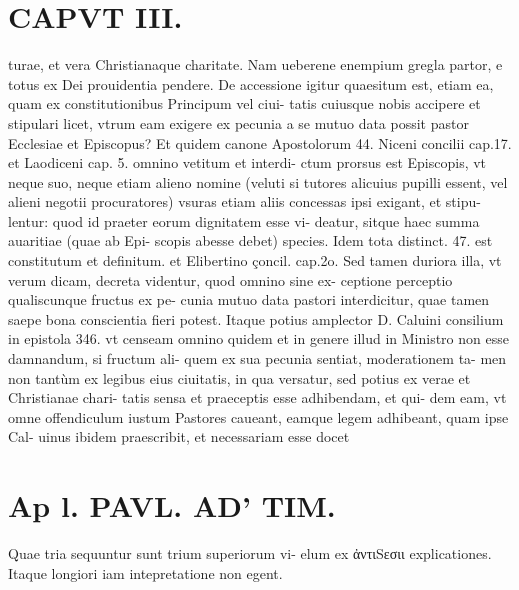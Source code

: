 \documentclass{article}
\begin{document}
\begin{pages}
\section*{CAPVT  III. }
\marginpar{[ p.139 ]}\pstart turae, et vera Christianaque charitate. Nam ueberene enempium gregla partor, e totus ex Dei prouidentia pendere.  \pend\pstart De accessione igitur quaesitum est, etiam ea, quam ex constitutionibus Principum vel ciui- tatis cuiusque nobis accipere et stipulari licet, vtrum eam exigere ex pecunia a se mutuo data possit pastor Ecclesiae et Episcopus? Et quidem canone Apostolorum 44. Niceni concilii cap.17. et Laodiceni cap. 5. omnino vetitum et interdi- ctum prorsus est Episcopis, vt neque suo, neque etiam alieno nomine (veluti si tutores alicuius pupilli essent, vel alieni negotii procuratores) vsuras etiam aliis concessas ipsi exigant, et stipu- lentur: quod id praeter eorum dignitatem esse vi- deatur, sitque haec summa auaritiae (quae ab Epi- scopis abesse debet) species. Idem tota distinct. 47. est constitutum et definitum. et Elibertino çoncil. cap.2o. Sed tamen duriora illa, vt verum dicam, decreta videntur, quod omnino sine ex- ceptione perceptio qualiscunque fructus ex pe- cunia mutuo data pastori interdicitur, quae tamen saepe bona conscientia fieri potest. Itaque potius amplector D. Caluini consilium in epistola 346. vt censeam omnino quidem et in genere illud in Ministro non esse damnandum, si fructum ali- quem ex sua pecunia sentiat, moderationem ta- men non tantùm ex legibus eius ciuitatis, in qua versatur, sed potius ex verae et Christianae chari- tatis sensa et praeceptis esse adhibendam, et qui- dem eam, vt omne offendiculum iustum Pastores caueant, eamque legem adhibeant, quam ipse Cal- uinus ibidem praescribit, et necessariam esse docet  \pend
\section*{Ap l. PAVL. AD' TIM. }
\marginpar{[ p.140 ]}\pstart Quae tria sequuntur sunt trium superiorum vi- elum ex ἀντιSεσιι explicationes. Itaque longiori iam intepretatione non egent.  \pend
{}
{}

\end{pages}
\end{document}
